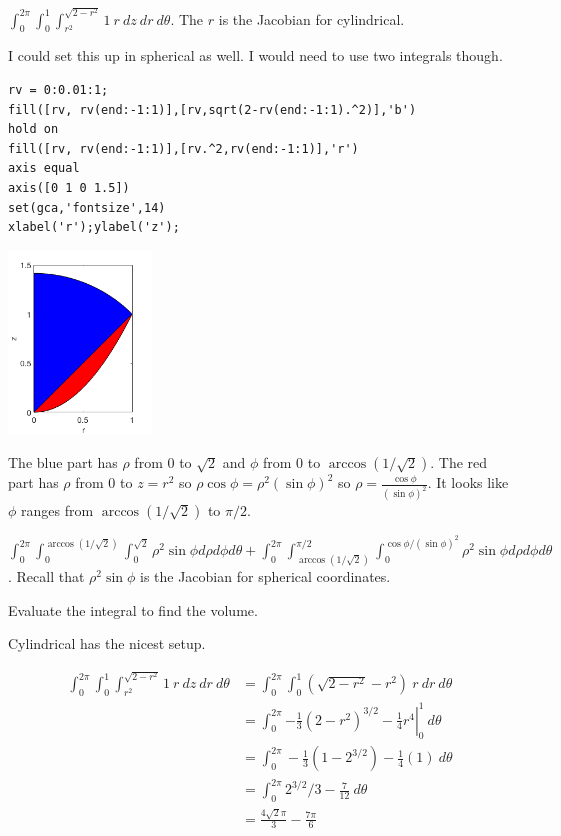\documentclass[12pt,letterpaper,noanswers]{exam}
\begin{document}
\begin{questions}
\begin{parts}
\begin{solution}
$\displaystyle\int_0^{2\pi}\int_0^1\int_{r^2}^{\sqrt{2-r^2}}1\ r\ dz\ dr\ d\theta.$  The $r$ is the Jacobian for cylindrical.

I could set this up in spherical as well.  I would need to use two integrals though.

\begin{verbatim}
rv = 0:0.01:1;
fill([rv, rv(end:-1:1)],[rv,sqrt(2-rv(end:-1:1).^2)],'b')
hold on
fill([rv, rv(end:-1:1)],[rv.^2,rv(end:-1:1)],'r')
axis equal
axis([0 1 0 1.5])
set(gca,'fontsize',14)
xlabel('r');ylabel('z');
\end{verbatim}

\includegraphics[width=1.5in]{img/pset07-p3-18.png}

The blue part has $\rho$ from $0$ to $\sqrt{2}$ and $\phi$ from $0$ to $\arccos(1/\sqrt{2}).$  The red part has $\rho$ from $0$ to $z = r^2$ so $\rho\cos\phi = \rho^2(\sin\phi)^2$ so $\rho = \frac{\cos\phi}{(\sin\phi)^2}$.
It looks like $\phi$ ranges from $\arccos(1/\sqrt{2})$ to $\pi/2$.

$\displaystyle\int_0^{2\pi}\int_0^{\arccos(1/\sqrt{2})}\int_0^{\sqrt{2}}\rho^2\sin\phi d\rho d\phi d\theta + \int_0^{2\pi}\int_{\arccos(1/\sqrt{2})}^{\pi/2}\int_0^{\cos\phi/(\sin\phi)^2}\rho^2\sin\phi d\rho d\phi d\theta$.  Recall that $\rho^2\sin\phi$ is the Jacobian for spherical coordinates.

\end{solution}
\item Evaluate the integral to find the volume.
\begin{solution}
Cylindrical has the nicest setup.
    
\begin{align*}
\int_0^{2\pi}\int_0^1\int_{r^2}^{\sqrt{2-r^2}}1\ r\ dz\ dr\ d\theta &= \int_0^{2\pi}\int_0^1(\sqrt{2-r^2}-r^2)\ r\ dr\ d\theta \\
&= \int_0^{2\pi}\left.-\frac{1}{3}(2-r^2)^{3/2}-\frac{1}{4}r^4\right\vert_0^1\ d\theta \\
&= \int_0^{2\pi}-\frac{1}{3}(1-2^{3/2})-\frac{1}{4}(1)\ d\theta \\
&= \int_0^{2\pi}2^{3/2}/3-\frac{7}{12}\ d\theta  \\
&= \frac{4\sqrt{2}\pi}{3} -\frac{7\pi}{6}
\end{align*}


\end{solution}
\end{parts}
\end{questions}
\end{document}
